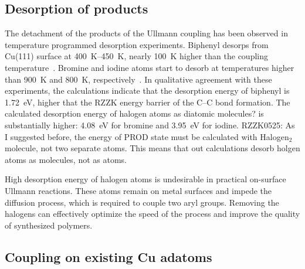\documentclass[aps,prb,reprint,amsmath,amssymb]{revtex4-1}
\newcommand{\lock}{\color{red}}
\newcommand{\lock}{\color{black}}
\newcommand{\comm}{\color{green}} %
\begin{document}
\ifdefined\INTERNAL
\subsection{Desorption of products}

{\lock

The detachment of the products of the Ullmann coupling has been observed in temperature programmed desorption experiments. Biphenyl desorps from Cu(111) surface at \SIrange{400}{450}{\kelvin}, nearly \SI{100}{\kelvin} higher than the coupling temperature~\cite{ullmann_104}. Bromine and iodine atoms start to desorb at temperatures higher than \SI{900}{\kelvin} and \SI{800}{\kelvin}, respectively~\cite{jacs2013, ullmann_104}. 
In qualitative agreement with these experiments, the calculations indicate that the desorption energy of biphenyl is \SI{+1.72}{\electronvolt}, higher that the RZZK energy barrier of the C--C bond formation. The calculated desorption energy of halogen atoms {\comm as diatomic molecules?} is substantially higher: \SI{+4.08}{\electronvolt} for bromine and \SI{+3.95}{\electronvolt} for iodine. 
{\comm RZZK0525: As I suggested before, the energy of PROD state must be calculated with Halogen$_2$ molecule, not two separate atoms. This means that out calculations desorb holgen atoms as molecules, not as atoms.}

High desorption energy of halogen atoms is undesirable in practical on-surface Ullmann reactions. These atoms remain on metal surfaces and impede the diffusion process, which is required to couple two aryl groups. Removing the halogens can effectively optimize the speed of the process and improve the quality of synthesized polymers.

}
\fi

\ifdefined\INTERNAL
\subsection{Coupling on existing Cu adatoms}
\fi
\end{document}
